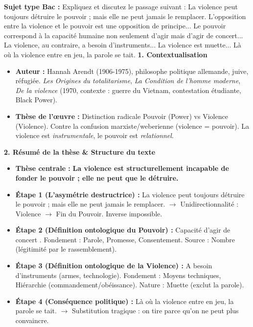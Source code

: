 \documentclass[11pt]{article}
\newcommand{\cle}[1]{{\popxbold\color{popdark}#1}}
\begin{document}
\begin{exoresolu}
\textbf{Sujet type Bac :} \guillemotleft Expliquez et discutez le passage suivant : \guillemotright
\guillemotleft La violence peut toujours détruire le pouvoir ; mais elle ne peut jamais le remplacer. L'opposition entre la violence et le pouvoir est une opposition de principe... Le pouvoir correspond à la capacité humaine non seulement d'agir mais d'agir de concert... La violence, au contraire, a besoin d'instruments... La violence est muette... Là où la violence entre en jeu, la parole se tait. \guillemotright
\tcblower
\textbf{1. Contextualisation}
\begin{itemize}
    \item \textbf{Auteur :} Hannah Arendt (1906-1975), philosophe politique allemande, juive, réfugiée. \emph{Les Origines du totalitarisme}, \emph{La Condition de l'homme moderne}, \emph{De la violence} (1970, contexte : guerre du Vietnam, contestation étudiante, Black Power).
    \item \textbf{Thèse de l'œuvre :} Distinction radicale \cle{Pouvoir} (Power) vs \cle{Violence} (Violence). Contre la confusion marxiste/weberienne (violence = pouvoir). La violence est \emph{instrumentale}, le pouvoir est \emph{relationnel}.
\end{itemize}

\textbf{2. Résumé de la thèse \& Structure du texte}
\begin{itemize}
    \item \textbf{Thèse centrale :} \textbf{La violence est structurellement incapable de fonder le pouvoir ; elle ne peut que le détruire.}
    \item \textbf{Étape 1 (L'asymétrie destructrice) :} \guillemotleft La violence peut toujours détruire le pouvoir ; mais elle ne peut jamais le remplacer. \guillemotright $\rightarrow$ Unidirectionnalité : Violence $\rightarrow$ Fin du Pouvoir. Inverse impossible.
    \item \textbf{Étape 2 (Définition ontologique du Pouvoir) :} \guillemotleft Capacité d'agir de concert \guillemotright. Fondement : \cle{Parole}, \cle{Promesse}, \cle{Consentement}. Source : \cle{Nombre} (légitimité par le rassemblement).
    \item \textbf{Étape 3 (Définition ontologique de la Violence) :} \guillemotleft A besoin d'instruments \guillemotright (armes, technologie). Fondement : \cle{Moyens techniques}, \cle{Hiérarchie} (commandement/obéissance). Nature : \cle{Muette} (exclut la parole).
    \item \textbf{Étape 4 (Conséquence politique) :} \guillemotleft Là où la violence entre en jeu, la parole se tait. \guillemotright $\rightarrow$ Substitution tragique : on tire parce qu'on ne peut plus convaincre.
\end{itemize}


\end{exoresolu}
\end{document}
